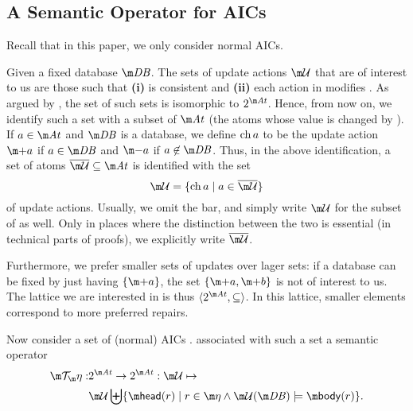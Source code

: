 \subsection{A Semantic Operator for AICs}
Recall that in this paper, we only consider normal AICs.

Given a fixed database $\db$.
The sets of update actions $\UU$ that are of interest to us are those such that \textbf{(i)} \UU is consistent and \textbf{(ii)} each action in \UU modifies \db. As argued by  \citet{iclp/Cruz-Filipe16}, the set of such sets is isomorphic to $2^{\atoms}$. Hence, from now on, we identify such a set with a subset of $\atoms$ (the atoms whose value is changed by \UU). 
If $a\in \atoms$ and $\db$ is a database, we define $\operatorname{ch} a$ to be the update action $\add a$ if $a\in \db$ and $\remove a$ if $a\not \in \db$. 
Thus, in the above identification, a set  of atoms $\overline\UU\subseteq \atoms$ is identified with the set 
\[\UU = \{\change a\mid a \in \overline \UU \}\]
of update actions.
Usually, we omit the bar, and simply write $\UU$ for the subset of \atoms as well. Only in places where the distinction between the two is essential (in technical parts of proofs), we explicitly write $\overline \UU$. 

Furthermore, we prefer smaller sets of updates over lager sets: if a database can be fixed by just having $\{\add a\}$, the set $\{\add a, \add b\}$ is not of interest to us. 
The lattice we are interested in is thus $\langle 2^{\atoms}, \subseteq\rangle$. 
In this lattice, smaller elements correspond to more preferred repairs. 


Now consider a set of (normal) AICs \aics. 
\citet{iclp/Cruz-Filipe16} associated with such a set a semantic operator
\begin{align*}\Op: &2^{\atoms}\to  2^{\atoms}: \UU \mapsto  \\ &\UU \biguplus \{\head(r) \mid r\in\aics \land  \UU(\db)\models \body(r)\}.\end{align*}

